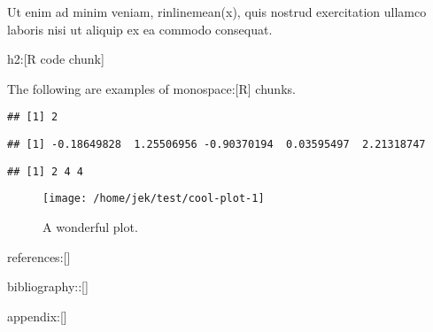 Ut enim ad minim veniam, rinline{mean(x)},
quis nostrud exercitation ullamco laboris nisi ut aliquip ex ea commodo consequat.

h2:[R code chunk]

The following are examples of monospace:[R] chunks.

\begin{knitrout}
\color{fgcolor}\begin{kframe}
\begin{alltt}
\hlopt{+}
\end{alltt}
\begin{verbatim}
## [1] 2
\end{verbatim}
\begin{alltt}
\hlstd{(}\hlstd{)}
\end{alltt}
\begin{verbatim}
## [1] -0.18649828  1.25506956 -0.90370194  0.03595497  2.21318747
\end{verbatim}
\begin{alltt}
\hlopt{:}\hlopt{+}\hlopt{:} 
\end{alltt}


{\ttfamily\noindent\color{warningcolor}{\#\# Warning in 1:2 + 1:3: longer object length is not a multiple of shorter object length}}\begin{verbatim}
## [1] 2 4 4
\end{verbatim}
\begin{alltt}
\hlkwb{=}\hlstd{()\{}\hlstd{(}\hlstd{)\}}
\hlstd{()}
\end{alltt}


{\ttfamily\noindent\itshape\color{messagecolor}{\#\# Aloha, this is a friendly message!}}\begin{alltt}
\hlopt{+} 
\end{alltt}


{\ttfamily\noindent\bfseries{}}\end{kframe}
\end{knitrout}

\begin{knitrout}
\color{fgcolor}\begin{kframe}
\begin{alltt}
\hlstd{(}\hlstd{=}\hlstd{(}\hlstd{,} \hlstd{,} \hlstd{,} \hlstd{))}
 \hlstd{=}\hlstd{)}
\end{alltt}
\end{kframe}\begin{figure}
\texttt{[image: /home/jek/test/cool-plot-1]} \caption[A wonderful plot]{A wonderful plot.}\label{fig:cool-plot}
\end{figure}


\end{knitrout}

references:[]

bibliography::[]

appendix:[]

